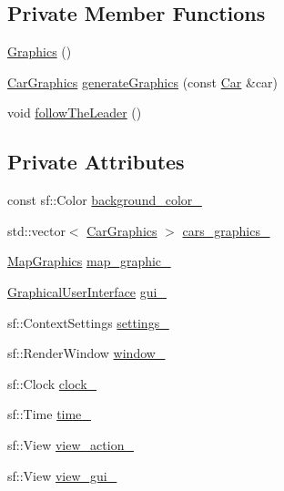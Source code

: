 \subsection*{Private Member Functions}
\begin{DoxyCompactItemize}
\item 
\hyperlink{classGraphics_af2e8fe67fd31ec263c843a6e28b29d3c}{Graphics} ()
\item 
\hyperlink{classCarGraphics}{Car\+Graphics} \hyperlink{classGraphics_a504c1b9aa359dbe8b05f8879c1045610}{generate\+Graphics} (const \hyperlink{classCar}{Car} \&car)
\item 
void \hyperlink{classGraphics_ad3718f2541f28115865058823113f5cd}{follow\+The\+Leader} ()
\end{DoxyCompactItemize}
\subsection*{Private Attributes}
\begin{DoxyCompactItemize}
\item 
const sf\+::\+Color \hyperlink{classGraphics_a44d7a76a58e03b8ad3f025123894c526}{background\+\_\+color\+\_\+}
\item 
std\+::vector$<$ \hyperlink{classCarGraphics}{Car\+Graphics} $>$ \hyperlink{classGraphics_a8be356ffe3ee47f915027361b6ae34ab}{cars\+\_\+graphics\+\_\+}
\item 
\hyperlink{classMapGraphics}{Map\+Graphics} \hyperlink{classGraphics_a7b3e98774ea965783584d5351c730276}{map\+\_\+graphic\+\_\+}
\item 
\hyperlink{classGraphicalUserInterface}{Graphical\+User\+Interface} \hyperlink{classGraphics_ac582857f6b0de010eabd0146c4a5f4d2}{gui\+\_\+}
\item 
sf\+::\+Context\+Settings \hyperlink{classGraphics_ab8d68b2977c39547e1c10a7669698aca}{settings\+\_\+}
\item 
sf\+::\+Render\+Window \hyperlink{classGraphics_ac760fe1abb0b648844c9f15afa087ef6}{window\+\_\+}
\item 
sf\+::\+Clock \hyperlink{classGraphics_ad9850d50fe5792666c8aea88f39ba99c}{clock\+\_\+}
\item 
sf\+::\+Time \hyperlink{classGraphics_ab2983b7d90351c0f7b824ac6f887fd6d}{time\+\_\+}
\item 
sf\+::\+View \hyperlink{classGraphics_a60792a296f5e93dbd1d086398e20cbd0}{view\+\_\+action\+\_\+}
\item 
sf\+::\+View \hyperlink{classGraphics_aaca5b237fae17f3166f8f28e4c363e06}{view\+\_\+gui\+\_\+}
\end{DoxyCompactItemize}

